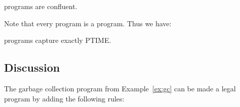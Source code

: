 \begin{corollary}
\label{cor:plang-confluent}
\plang programs are confluent.
\end{corollary}

Note that every \slang program is a \plang program.  Thus we have:

\begin{corollary}
\label{cor:plang-ptime}
\plang programs capture exactly PTIME.
\end{corollary}




\subsection{Discussion}
The garbage collection program from Example~\ref{ex:gc} can be made a legal 
\plang program by adding the following rules:

